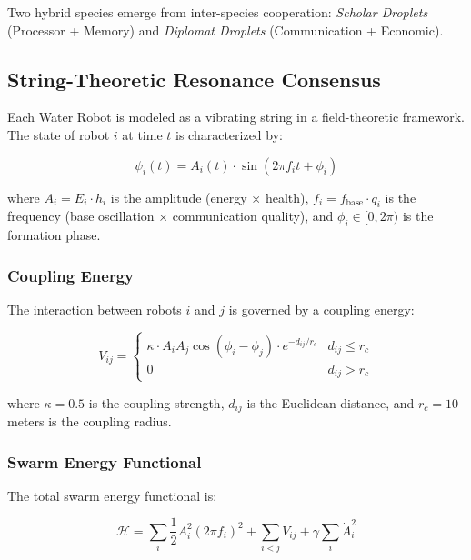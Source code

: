\documentclass[11pt,a4paper,twocolumn]{article}
\begin{document}
Two hybrid species emerge from inter-species cooperation: \textit{Scholar Droplets}
(Processor + Memory) and \textit{Diplomat Droplets} (Communication + Economic).

\subsection{String-Theoretic Resonance Consensus}

Each Water Robot is modeled as a vibrating string in a field-theoretic framework.
The state of robot $i$ at time $t$ is characterized by:

\begin{equation}
\psi_i(t) = A_i(t) \cdot \sin\!\left(2\pi f_i t + \phi_i\right)
\end{equation}

\noindent where $A_i = E_i \cdot h_i$ is the amplitude (energy $\times$ health),
$f_i = f_{\text{base}} \cdot q_i$ is the frequency (base oscillation $\times$
communication quality), and $\phi_i \in [0, 2\pi)$ is the formation phase.

\subsubsection{Coupling Energy}

The interaction between robots $i$ and $j$ is governed by a coupling energy:

\begin{equation}
V_{ij} = \begin{cases}
    \kappa \cdot A_i A_j \cos(\phi_i - \phi_j) \cdot e^{-d_{ij}/r_c} & d_{ij} \leq r_c \\
    0 & d_{ij} > r_c
\end{cases}
\end{equation}

\noindent where $\kappa = 0.5$ is the coupling strength, $d_{ij}$ is the Euclidean
distance, and $r_c = 10$ meters is the coupling radius.

\subsubsection{Swarm Energy Functional}

The total swarm energy functional is:

\begin{equation}
\mathcal{H} = \sum_i \frac{1}{2} A_i^2 (2\pi f_i)^2 + \sum_{i<j} V_{ij} + \gamma \sum_i \dot{A}_i^2
\end{equation}
\end{document}
